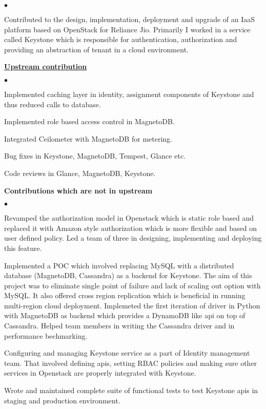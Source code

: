 \documentclass[11pt]{article}
\begin{document}
{\small

\noindent
\begin{list}{$\bullet$}{
}
\item Contributed to the design, implementation, deployment and upgrade of an IaaS platform based on OpenStack for Reliance Jio. Primarily I worked in a service called Keystone which is responsible for authentication, authorization and providing an abstraction of tenant in a cloud environment.

\item \href{http://stackalytics.com/?release=all&user_id=ajayaa}{\textbf{Upstream contribution}}
\begin{list}{$\bullet$}{
}
\item Implemented caching layer in identity, assignment components of Keystone and thus reduced calls to database.
\item Implemented role based access control in MagnetoDB.
\item Integrated Ceilometer with MagnetoDB for metering.
\item Bug fixes in Keystone, MagnetoDB, Tempest, Glance etc.
\item Code reviews in Glance, MagnetoDB, Keystone.
\end{list}
\item {\textbf{Contributions which are not in upstream}}
\begin{list}{$\bullet$}{
}
\item  Revamped the authorization model in Openstack which is static role based and replaced it with Amazon style authorization which is more flexible and based on user defined policy. Led a team of three in designing, implementing and deploying this feature.

\item Implemented a POC which involved replacing MySQL with a distributed database (MagnetoDB, Cassandra) as a backend for Keystone. The aim of this project was to eliminate single point of failure and lack of scaling out option with MySQL. It also offered cross region replication which is beneficial in running multi-region cloud deployment. Implemeted the first iteration of driver in Python with MagnetoDB as backend which provides a DynamoDB like api on top of Cassandra. Helped team members in writing the Cassandra driver and in performance bechmarking.

\item Configuring and managing Keystone service as a part of Identity management team. That involved defining apis, setting RBAC policies and making sure other services in Openstack are properly integrated with Keystone.

\item Wrote and maintained complete suite of functional tests to test Keystone apis in staging and production environment.

\end{list}
\end{list}
}
\end{document}
